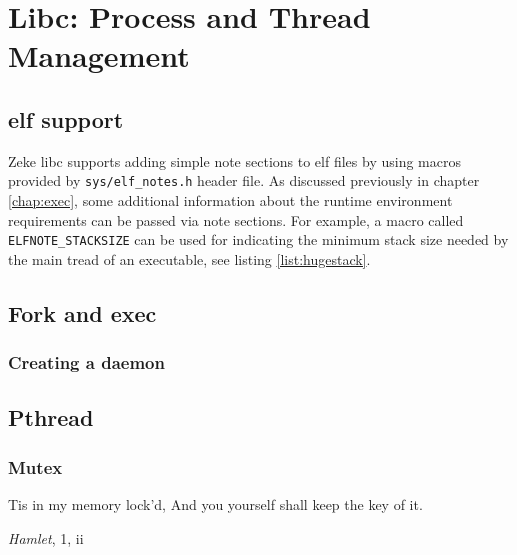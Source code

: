 \chapter{Libc: Process and Thread Management}

\section{\acs{elf} support}\label{sec:libc_elf}

Zeke libc supports adding simple note sections to \acs{elf} files by using
macros provided by \verb+sys/elf_notes.h+ header file. As discussed
previously in chapter \ref{chap:exec}, some additional information about the
runtime environment requirements can be passed via note sections. For example,
a macro called \verb+ELFNOTE_STACKSIZE+ can be used for indicating the minimum
stack size needed by the main tread of an executable, see listing
\ref{list:hugestack}.



\section{Fork and exec}

\subsection{Creating a daemon}



\section{Pthread}
\subsection{Mutex}

\epigraph{Tis in my memory lock'd,\newline
          And you yourself shall keep the key of it.}{\textit{Hamlet}, 1, ii}

